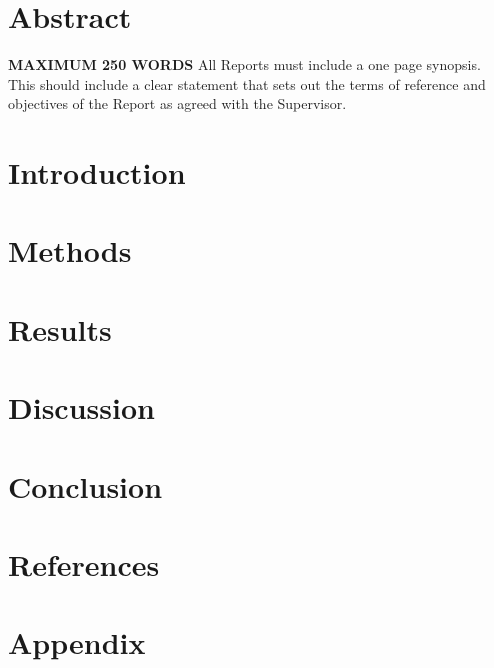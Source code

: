 \documentclass[a4paper,11]{article}
\begin{document}

\tableofcontents
\pagebreak
\listoffigures
\listoftables
\pagebreak
\newpage


\cleardoublepage{}


\section*{Abstract}
\textbf{MAXIMUM 250 WORDS}
All Reports must include a one page synopsis. This should include a clear statement that sets out the terms of reference and objectives of the Report as agreed with the Supervisor.
\pagebreak

\section{Introduction}

\pagebreak

\section{Methods}

\pagebreak

\section{Results}

\pagebreak

\section{Discussion}

\pagebreak

\section{Conclusion}

\pagebreak

\section{References}
\printbibliography[heading=none]
\pagebreak


\section{Appendix}

\end{document}
